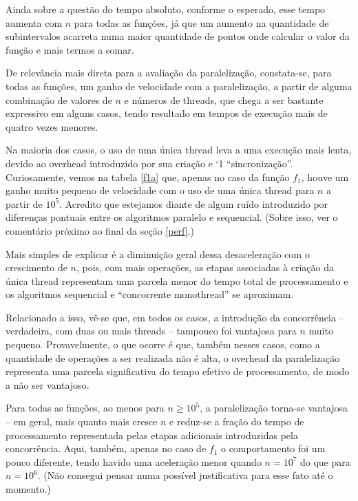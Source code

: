 \documentclass{article}
\begin{document}
  Ainda sobre a questão do tempo absoluto, conforme o esperado, esse tempo aumenta com $n$ para todas as funções, já que um aumento na quantidade de subintervalos acarreta numa maior quantidade de pontos onde calcular o valor da função e mais termos a somar.

  De relevância mais direta para a avaliação da paralelização, constata-se, para todas as funções, um ganho de velocidade com a paralelização, a partir de alguma combinação de valores de $n$ e números de threads, que chega a ser bastante expressivo em alguns casos, tendo resultado em tempos de execução mais de quatro vezes menores.

  Na maioria dos casos, o uso de uma única thread leva a uma execução mais lenta, devido ao overhead introduzido por sua criação e `1 ``sincronização''. Curiosamente, vemos na tabela \ref{f1a} que, apenas no caso da função $f_1$, houve um ganho muito pequeno de velocidade com o uso de uma única thread para $n$ a partir de $10^5$. Acredito que estejamos diante de algum ruído introduzido por diferenças pontuais entre os algoritmos paralelo e sequencial. (Sobre isso, ver o comentário próximo ao final da seção \ref{perf}.)
  
  Mais simples de explicar é a diminuição geral dessa desaceleração com o crescimento de $n$, pois, com mais operações, as etapas associadas à criação da única thread representam uma parcela menor do tempo total de processamento e os algoritmos sequencial e ``concorrente monothread'' se aproximam.

  Relacionado a isso, vê-se que, em todos os casos, a introdução da concorrência -- verdadeira, com duas ou mais threads -- tampouco foi vantajosa para $n$ muito pequeno. Provavelmente, o que ocorre é que, também nesses casos, como a quantidade de operações a ser realizada não é alta, o overhead da paralelização representa uma parcela significativa do tempo efetivo de processamento, de modo a não ser vantajoso.

  Para todas as funções, ao menos para $n \geq 10^5$, a paralelização torna-se vantajosa -- em geral, mais quanto mais cresce $n$ e reduz-se a fração do tempo de processamento representada pelas etapas adicionais introduzidas pela concorrência. Aqui, também, apenas no caso de $f_1$ o comportamento foi um pouco diferente, tendo havido uma aceleração menor quando $n = 10^7$ do que para $n = 10^6$. (Não consegui pensar numa possível justificativa para esse fato até o momento.)

\end{document}
